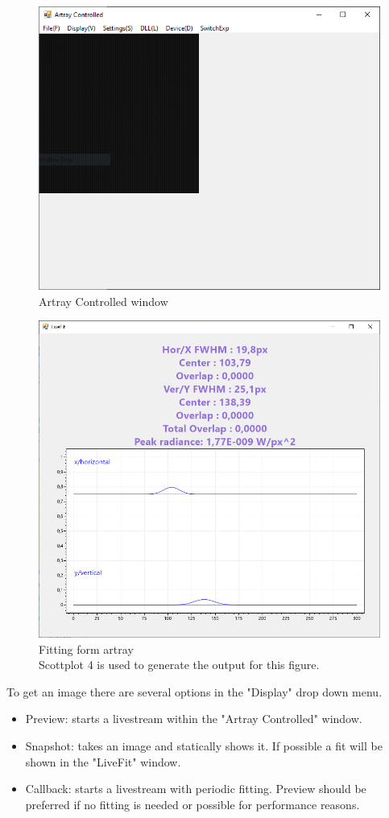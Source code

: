 \documentclass[twoside,openright]{scrreprt}
\begin{document}
\begin{figure}[hbtp]
\centering
\includegraphics[width = 0.6\linewidth]{images/ArtrayExamplePics/ArtrayControlledMain.PNG}
\caption{Artray Controlled window\label{fig:ArtrayMain}}
\end{figure}

\begin{figure}[hbtp]
\centering
\includegraphics[width = 0.6\linewidth]{images/ArtrayExamplePics/FittingForm.PNG}
\caption{Fitting form artray\\Scottplot 4 is used to generate the output for this figure.\label{fig:ArtrayFitting}}
\end{figure}


To get an image there are several options in the "Display" drop down menu.
\begin{itemize}
\item Preview: starts a livestream within the "Artray Controlled" window.
\item Snapshot: takes an image and statically shows it. If possible a fit will be shown in the "LiveFit" window.
\item Callback: starts a livestream with periodic fitting. Preview should be preferred if no fitting is needed or possible for performance reasons.
\end{itemize}
\end{document}

